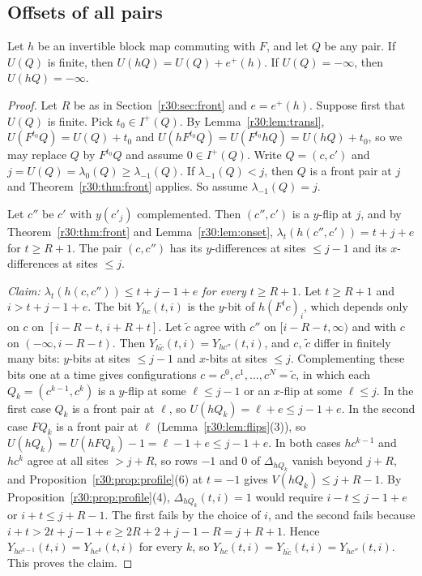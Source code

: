\subsection{Offsets of all pairs}\label{r30:sec:allpairs}

\begin{lemma}\label{r30:lem:allpairs}
Let $h$ be an invertible block map commuting with $F$, and let $Q$ be any pair. If $U(Q)$ is finite, then $U(hQ)=U(Q)+e^+(h)$. If $U(Q)=-\infty$, then $U(hQ)=-\infty$.
\end{lemma}

\begin{proof}
Let $R$ be as in Section~\ref{r30:sec:front} and $e=e^+(h)$. Suppose first that $U(Q)$ is finite. Pick $t_0\in I^+(Q)$. By Lemma~\ref{r30:lem:transl}, $U(F^{t_0}Q)=U(Q)+t_0$ and $U(hF^{t_0}Q)=U(F^{t_0}hQ)=U(hQ)+t_0$, so we may replace $Q$ by $F^{t_0}Q$ and assume $0\in I^+(Q)$. Write $Q=(c,c')$ and $j=U(Q)=\lambda_0(Q)\ge\lambda_{-1}(Q)$. If $\lambda_{-1}(Q)<j$, then $Q$ is a front pair at $j$ and Theorem~\ref{r30:thm:front} applies. So assume $\lambda_{-1}(Q)=j$.

Let $c''$ be $c'$ with $y(c'_j)$ complemented. Then $(c'',c')$ is a $y$-flip at $j$, and by Theorem~\ref{r30:thm:front} and Lemma~\ref{r30:lem:onset}, $\lambda_t(h(c'',c'))=t+j+e$ for $t\ge R+1$. The pair $(c,c'')$ has its $y$-differences at sites $\le j-1$ and its $x$-differences at sites $\le j$.

\emph{Claim: $\lambda_t(h(c,c''))\le t+j-1+e$ for every $t\ge R+1$.} Let $t\ge R+1$ and $i>t+j-1+e$. The bit $Y_{hc}(t,i)$ is the $y$-bit of $h(F^tc)_i$, which depends only on $c$ on $[i-R-t,\,i+R+t]$. Let $\tilde c$ agree with $c''$ on $[i-R-t,\infty)$ and with $c$ on $(-\infty,i-R-t)$. Then $Y_{h\tilde c}(t,i)=Y_{hc''}(t,i)$, and $c$, $\tilde c$ differ in finitely many bits: $y$-bits at sites $\le j-1$ and $x$-bits at sites $\le j$. Complementing these bits one at a time gives configurations $c=c^0,c^1,\dots,c^N=\tilde c$, in which each $Q_k=(c^{k-1},c^k)$ is a $y$-flip at some $\ell\le j-1$ or an $x$-flip at some $\ell\le j$. In the first case $Q_k$ is a front pair at $\ell$, so $U(hQ_k)=\ell+e\le j-1+e$. In the second case $FQ_k$ is a front pair at $\ell$ (Lemma~\ref{r30:lem:flips}(3)), so $U(hQ_k)=U(hFQ_k)-1=\ell-1+e\le j-1+e$. In both cases $hc^{k-1}$ and $hc^k$ agree at all sites $>j+R$, so rows $-1$ and $0$ of $\Delta_{hQ_k}$ vanish beyond $j+R$, and Proposition~\ref{r30:prop:profile}(6) at $t=-1$ gives $V(hQ_k)\le j+R-1$. By Proposition~\ref{r30:prop:profile}(4), $\Delta_{hQ_k}(t,i)=1$ would require $i-t\le j-1+e$ or $i+t\le j+R-1$. The first fails by the choice of $i$, and the second fails because $i+t>2t+j-1+e\ge 2R+2+j-1-R=j+R+1$. Hence $Y_{hc^{k-1}}(t,i)=Y_{hc^k}(t,i)$ for every $k$, so $Y_{hc}(t,i)=Y_{h\tilde c}(t,i)=Y_{hc''}(t,i)$. This proves the claim.


\end{proof}
